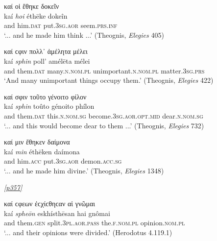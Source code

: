 \begin{exe}
\ex καί οἱ ἔθηκε δοκεῖν\\
\gll kaí \emph{hoi} éthēke dokeîn\\
and him.\textsc{dat} put.\textsc{3sg.aor} seem.\textsc{prs.inf}\\
\trans `... and he made him think ...' (Theognis, \textit{Elegies} 405)
\label{kaihoi}
\end{exe}

\begin{exe}
\ex καί ϲφιν πολλ᾽ ἀμέλητα μέλει\\
\gll kaí \emph{sphin} poll' amélēta mélei\\
and them.\textsc{dat} many.\textsc{n.nom.pl} unimportant.\textsc{n.nom.pl} matter.\textsc{3sg.prs}\\
\trans `And many unimportant things occupy them.' (Theognis, \textit{Elegies} 422)
\label{kaisphin2}
\end{exe}

\begin{exe}
\ex καί σφιν τοῦτο γένοιτο φίλον\\
\gll kaí \emph{sphin} toûto génoito phílon\\
and them.\textsc{dat} this.\textsc{n.nom.sg} become.\textsc{3sg.aor.opt.mid} dear.\textsc{n.nom.sg}\\
\trans `... and this would become dear to them ...' (Theognis, \textit{Elegies} 732)
\label{kaisphin3}
\end{exe}

\begin{exe}
\ex καί μιν ἔθηκεν δαίμονα\\
\gll kaí \emph{min} éthēken daímona\\
and him.\textsc{acc} put.\textsc{3sg.aor} demon.\textsc{acc.sg}\\
\trans `... and he made him divine.' (Theognis, \textit{Elegies} 1348)
\label{kaimin2}
\end{exe}

\hyperlink{p357}{\emph{[p357]}}

\begin{exe}
\ex καί ϲφεων ἐϲχίϲθηϲαν αἱ γνῶμαι\\
\gll kaí \emph{spheōn} eskhísthēsan hai gnômai\\
and them.\textsc{gen} split.\textsc{3pl.aor.pass} the.\textsc{f.nom.pl} opinion.\textsc{nom.pl}\\
\trans `... and their opinions were divided.' (Herodotus 4.119.1)
\label{kaispheon}
\end{exe}

